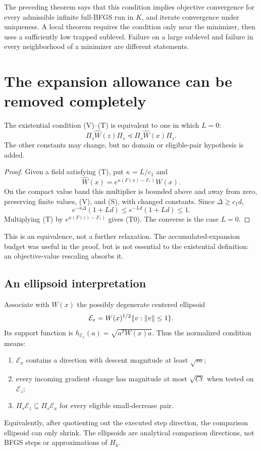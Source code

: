 The preceding theorem says that this condition implies objective convergence for every admissible infinite full-BFGS run in $K$, and iterate convergence under uniqueness. A local theorem requires the condition only near the minimizer, then uses a sufficiently low trapped sublevel. Failure on a large sublevel and failure in every neighborhood of a minimizer are different statements.


\setcounter{section}{1}
\setcounter{theorem}{0}
\setcounter{equation}{1}
\section{The expansion allowance can be removed completely}
\begin{proposition}
The existential condition (V)--(T) is equivalent to one in which $L=0$:
\begin{equation}
 \Pi_s\widehat W(z)\Pi_s\preceq\Pi_s\widehat W(x)\Pi_s. \tag{G.T0}
\end{equation}
The other constants may change, but no domain or eligible-pair hypothesis is added.
\end{proposition}
\begin{proof}
Given a field satisfying (T), put $\kappa=L/c_1$ and
\[
 \widehat W(x)=e^{\kappa(F(x)-F_*)}W(x).
\]
On the compact value band this multiplier is bounded above and away from zero, preserving finite values, (V), and (S), with changed constants. Since $\Delta\ge c_1d$,
\[
 e^{-\kappa\Delta}(1+Ld)\le e^{-Ld}(1+Ld)\le1.
\]
Multiplying (T) by $e^{\kappa(F(z)-F_*)}$ gives (T0). The converse is the case $L=0$.
\end{proof}
This is an equivalence, not a further relaxation. The accumulated-expansion budget was useful in the proof, but is not essential to the existential definition: an objective-value rescaling absorbs it.

\subsection{An ellipsoid interpretation}
Associate with $W(x)$ the possibly degenerate centered ellipsoid
\[
 \mathcal E_x=W(x)^{1/2}\{v:\left\|v\right\|\le1\}.
\]
Its support function is $h_{\mathcal E_x}(a)=\sqrt{a^TW(x)a}$. Thus the normalized condition means:
\begin{enumerate}[label=(\roman*),itemsep=3pt]
\item $\mathcal E_x$ contains a direction with descent magnitude at least $\sqrt m$;
\item every incoming gradient change has magnitude at most $\sqrt{Ct}$ when tested on $\mathcal E_z$;
\item $\Pi_s\mathcal E_z\subseteq\Pi_s\mathcal E_x$ for every eligible small-decrease pair.
\end{enumerate}
Equivalently, after quotienting out the executed step direction, the comparison ellipsoid can only shrink. The ellipsoids are analytical comparison directions, not BFGS steps or approximations of $H_k$.

